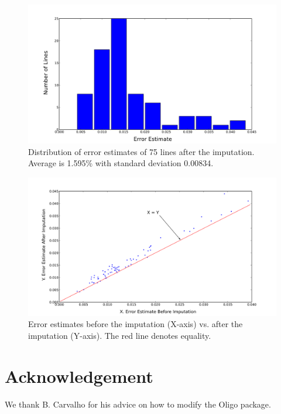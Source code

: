 \documentclass[a4paper,10pt]{article}
\begin{document}
\begin{figure}
  \includegraphics[width=1.0\textwidth]{figures/call_method_33_vs_2010_mismatch_rate_hist.png}
  \caption{Distribution of error estimates of 75 lines after the imputation. Average is 1.595\% with standard deviation 0.00834.}\label{genotyping_f2}
\end{figure}

\begin{figure}
  \includegraphics[width=1.0\textwidth]{figures/call_method_35_vs_2010_mismatch_rate_vs_call_method_33_vs_2010_mismatch_rate.png}
  \caption{Error estimates before the imputation (X-axis) vs. after the imputation (Y-axis). The red line denotes equality.}\label{genotyping_f3}
\end{figure}






\section{Acknowledgement}
We thank B. Carvalho for his advice on how to modify the Oligo package.




\end{document}
